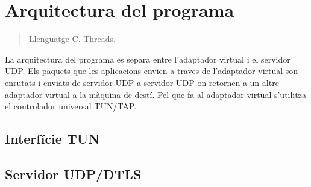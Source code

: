 \section{Arquitectura del programa}
\begin{quote}
Llenguatge C.
Threads.
\end{quote}
La arquitectura del programa es separa entre l'adaptador virtual i el servidor UDP. Els paquets que les aplicacions envien a traves de l'adaptador virtual son enrutats i enviats de servidor UDP a servidor UDP on retornen a un altre adaptador virtual a la màquina de destí.
Pel que fa al adaptador virtual s'utilitza el controlador universal TUN/TAP.
\subsection{Interfície TUN}

\subsection{Servidor UDP/DTLS}
